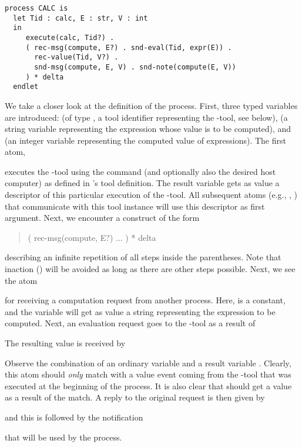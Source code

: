 \small
\begin{verbatim}
process CALC is
  let Tid : calc, E : str, V : int
  in
     execute(calc, Tid?) .
     ( rec-msg(compute, E?) . snd-eval(Tid, expr(E)) .
       rec-value(Tid, V?) .
       snd-msg(compute, E, V) . snd-note(compute(E, V))
     ) * delta
  endlet

\end{verbatim}
\noindent
\normalsize
 We take a closer look at the definition of the  process.
 First, three typed variables are introduced:  (of type ,
 a tool identifier representing the -tool, see below),
  (a string variable representing the expression whose value is to be computed),
 and  (an integer variable representing the computed value of expressions).
 The first atom,
 \begin{quote}
 \end{quote}
 executes the -tool using the
 command (and optionally also the desired host computer)
 as defined in 's tool definition.  The
 result variable  gets as value a descriptor of
 this particular execution of the -tool. All
 subsequent atoms (e.g., , )
 that communicate with this tool instance will use this descriptor as
 first argument. Next, we encounter a construct of the form
 \begin{quote}
 ( rec-msg(compute, E?)
   ...
 ) * delta
 \end{quote}
 describing an infinite repetition of all steps inside the parentheses.
 Note that inaction () will be avoided as long as there
 are other steps possible.
 Next, we see the atom
 \begin{quote}
 \end{quote}
 for receiving a computation request from another process. Here, 
 is a constant, and the variable  will get as value a string
 representing the expression to be computed. Next, an evaluation request
 goes to the -tool as a result of
 \begin{quote}
 \end{quote}
 The resulting value is received by
 \begin{quote}
 \end{quote}
 Observe the combination of an ordinary variable  and
 a result variable .  Clearly, this atom should {\em only}
 match with a value event coming from the -tool that was
 executed at the beginning of the  process.  It is also
 clear that  should get a value as a result of the match.
 A reply to the original request  is then given by
 \begin{quote}
 \end{quote}
 and this is followed by the notification
 \begin{quote}
 \end{quote}
 that will be used by the  process.

